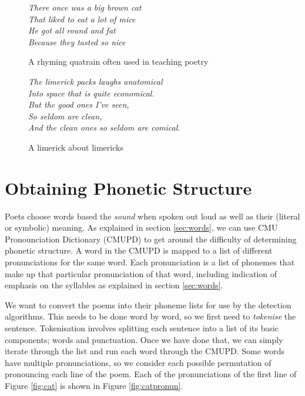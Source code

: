 \begin{figure}
\centering
\begin{minipage}{0.45\textwidth}
\centering
\textit{
There once was a big brown cat\\
That liked to eat a lot of mice\\
He got all round and fat\\
Because they tasted so nice
}
\caption{A rhyming quatrain often used in teaching poetry}
\label{fig:cat}
\end{minipage}\hfill
\begin{minipage}{0.45\textwidth}
\centering
\textit{
The limerick packs laughs anatomical\\
Into space that is quite economical.\\
    But the good ones I've seen,\\
    So seldom are clean,\\
And the clean ones so seldom are comical.
}
\caption{A limerick about limericks}
\label{fig:limerick}
\end{minipage}
\end{figure}


\section{Obtaining Phonetic Structure}

Poets choose words based the \textit{sound} when spoken out loud as well as their (literal or symbolic) meaning. As explained in section \ref{sec:words}, we can use CMU Pronounciation Dictionary (CMUPD) to get around the difficulty of determining phonetic structure. A word in the CMUPD is mapped to a list of different pronunciations for the same word. Each pronunciation is a list of phonemes that make up that particular pronunciation of that word, including indication of emphasis on the syllables as explained in section \ref{sec:words}.

We want to convert the poems into their phoneme lists for use by the detection algorithms. This needs to be done word by word, so we first need to \textit{tokenise} the sentence. Tokenisation involves splitting each sentence into a list of its basic components; words and punctuation. Once we have done that, we can simply iterate through the list and run each word through the CMUPD. Some words have multiple pronunciations, so we consider each possible permutation of pronouncing each line of the poem. Each of the pronunciations of the first line of Figure \ref{fig:cat} is shown in Figure \ref{fig:catpronun}.

